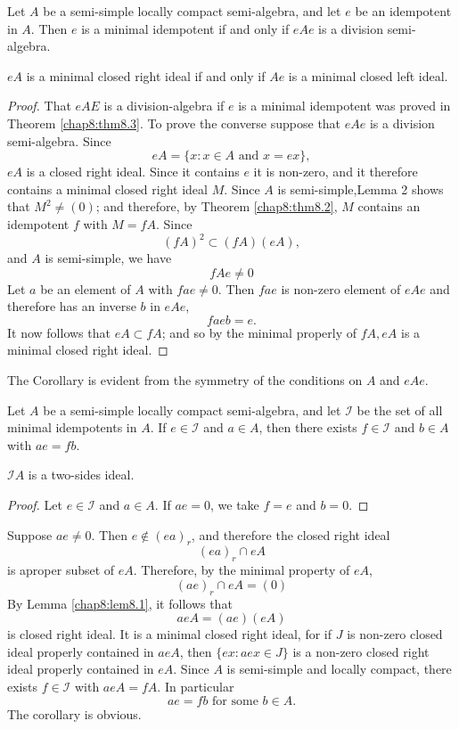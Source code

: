 \begin{thmm} %
  Let $A$ be a semi-simple locally compact semi-algebra, and let $e$
  be an idempotent in $A$. Then $e$ is a minimal idempotent if and
  only if $eAe$ is a division semi-algebra. 
\end{thmm}

\begin{coro*}%
  $eA$ is a minimal closed right ideal if and only if $Ae$ is a
  minimal closed left ideal. 
\end{coro*}

\begin{proof}
  That $eAE$ is a  division-algebra if $e$ is a minimal idempotent was
  proved in Theorem \ref{chap8:thm8.3}. To prove the converse suppose
  that $eAe$ is a division semi-algebra. Since  
  $$
  eA= \{ x:x \in A \text{ and } x=ex \},
  $$
  $eA$ is a closed right ideal. Since it contains $e$ it is non-zero,
  and it therefore contains a minimal closed right ideal $M$. Since
  $A$ is semi-simple,\pageoriginale Lemma 2 shows that $M^2 \neq (0)$;
  and therefore, by Theorem \ref{chap8:thm8.2}, $M$ contains an
  idempotent $f$ with  
  $M=fA$. Since  
  $$
  (fA)^2 \subset (fA) (eA),
  $$
  and $A$ is semi-simple, we have
  $$
  f Ae \neq 0
  $$
  Let $a$ be an element of $A$ with $fae \neq 0$. Then $fae$ is non-zero
  element of $eAe$ and therefore has an inverse $b$ in $eAe$, 
  $$
  fae b=e.
  $$
  It now follows that $eA \subset fA$; and so by the minimal properly
  of $fA,eA$ is a minimal closed right ideal. 
\end{proof}

The Corollary is evident from the symmetry of the conditions on $A$
and $eAe$. 

\begin{thmm} %
  Let $A$ be a semi-simple locally compact semi-algebra, and let
  $\mathscr{I}$ be the set of all minimal idempotents in $A$. If $e
  \in \mathscr{I}$ and $a \in A$, then there exists $f \in
  \mathscr{I}$ and $b \in A$ with $ae=fb$. 
\end{thmm}

\begin{coro*}%
  $\mathscr{I}A$ is a two-sides ideal.
\end{coro*}

\begin{proof}
  Let $e \in \mathscr{I}$ and $a \in A$. If $ae=0$, we take $f=e$ and $b=0$.
\end{proof}

Suppose $ae \neq 0$. Then $e \notin (ea)_r$, and therefore the closed
right ideal 
$$
(ea)_r \cap eA
$$
is a\pageoriginale proper subset of $eA$. Therefore, by the minimal
property of $eA$, 
$$
(ae)_r \cap eA=(0)
$$
By Lemma \ref{chap8:lem8.1}, it follows that
$$
aeA=(ae)(eA)
$$
is closed right ideal. It is a minimal closed right ideal, for if $J$
is non-zero closed ideal properly contained in $aeA$, then $\{ ex:aex
\in J \}$ is a non-zero closed right ideal properly contained in
$eA$. Since $A$ is semi-simple and locally compact, there exists $f
\in \mathscr{I}$ with $aeA=fA$. In particular 
$$
ae=fb \text{ for some } b \in A.
$$
The corollary is obvious.

